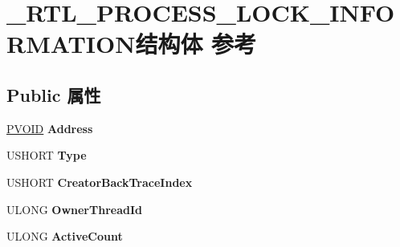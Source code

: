 \hypertarget{struct___r_t_l___p_r_o_c_e_s_s___l_o_c_k___i_n_f_o_r_m_a_t_i_o_n}{}\section{\+\_\+\+R\+T\+L\+\_\+\+P\+R\+O\+C\+E\+S\+S\+\_\+\+L\+O\+C\+K\+\_\+\+I\+N\+F\+O\+R\+M\+A\+T\+I\+O\+N结构体 参考}
\label{struct___r_t_l___p_r_o_c_e_s_s___l_o_c_k___i_n_f_o_r_m_a_t_i_o_n}
\subsection*{Public 属性}
\begin{DoxyCompactItemize}
\item 
\mbox{\label{struct___r_t_l___p_r_o_c_e_s_s___l_o_c_k___i_n_f_o_r_m_a_t_i_o_n_a5560ae6f2f2d415df84874e61a99f1ea}} 
\hyperlink{interfacevoid}{P\+V\+O\+ID} {\bfseries Address}
\item 
\mbox{\label{struct___r_t_l___p_r_o_c_e_s_s___l_o_c_k___i_n_f_o_r_m_a_t_i_o_n_a7c72c58e44df306a8f3d492928a30a21}} 
U\+S\+H\+O\+RT {\bfseries Type}
\item 
\mbox{\label{struct___r_t_l___p_r_o_c_e_s_s___l_o_c_k___i_n_f_o_r_m_a_t_i_o_n_a847fbe00b4804756c7add8a035d4f1cf}} 
U\+S\+H\+O\+RT {\bfseries Creator\+Back\+Trace\+Index}
\item 
\mbox{\label{struct___r_t_l___p_r_o_c_e_s_s___l_o_c_k___i_n_f_o_r_m_a_t_i_o_n_aba7e0c674ed2c5bfc5e75c295bdd0336}} 
U\+L\+O\+NG {\bfseries Owner\+Thread\+Id}
\item 
\mbox{\label{struct___r_t_l___p_r_o_c_e_s_s___l_o_c_k___i_n_f_o_r_m_a_t_i_o_n_adb2898b93b6184d3324e05a760303abc}} 
U\+L\+O\+NG {\bfseries Active\+Count}
\item 
\mbox{\label{struct___r_t_l___p_r_o_c_e_s_s___l_o_c_k___i_n_f_o_r_m_a_t_i_o_n_a3398c1c1460f01f68d9f4758db5b09cd}} 

\end{DoxyCompactItemize}
